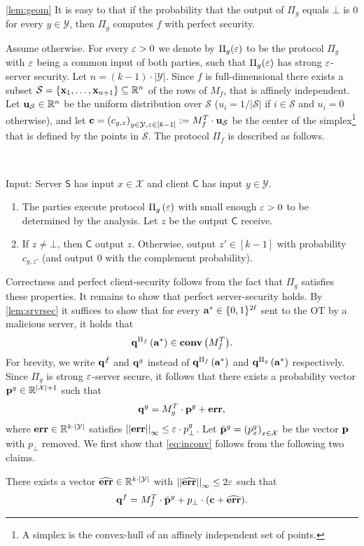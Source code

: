 \documentclass{llncs}
\renewcommand{\S}{\mathcal{S}}
\newcommand{\X}{\mathcal{X}}
\newcommand{\Y}{\mathcal{Y}}
\newcommand{\CH}[1]{\normalfont{\mathbf{conv}\of{#1}}}
\newcommand{\p}{\myvec{p}}
\renewcommand{\q}{\myvec{q}}
\renewcommand{\a}{\myvec{a}}
\renewcommand{\c}{\myvec{c}}
\newcommand{\x}{\myvec{x}}
\newcommand{\errvec}{\myvec{err}}
\newcommand{\norm}[2]{\left|\left|#1\right|\right|_{#2}}
\renewcommand{\Sc}{\mathsf{S}}
\newcommand{\Cc}{\mathsf{C}}
\begin{document}
\begin{proofof}{\cref{lem:geom}}
It is easy to that if the probability that the output of $\Pi_g$ equals $\bot$ is 0 for every $y\in\Y$, then $\Pi_g$ computes $f$ with perfect security.

Assume otherwise. For every $\varepsilon>0$ we denote by $\Pi_g(\varepsilon)$ to be the protocol $\Pi_g$ with $\varepsilon$ being a common input of both parties, such that $\Pi_g(\varepsilon)$ has strong $\varepsilon$-server security. Let $n=(k-1)\cdot|\Y|$. Since $f$ is full-dimensional there exists a subset $\S=\set{\x_1,\ldots,\x_{n+1}}\su\R^{n}$ of the rows of $M_f$, that is affinely independent. Let $\myvec{u}_\S\in\R^{n}$ be the uniform distribution over $\S$ (\ie $u_i=1/|\S|$ if $i\in\S$ and $u_i=0$ otherwise), and let $\c=\vect{c_{y,z}}_{y\in\Y,z\in[k-1]}:=M^T_f\cdot\myvec{u}_{\S}$ be the center of the simplex\footnote{A simplex is the convex-hull of an affinely independent set of points.} that is defined by the points in $\S$. The protocol $\Pi_f$ is described as follows. 

\begin{protocol}[$\Pi_f$]~

Input: Server $\Sc$ has input $x\in\X$ and client $\Cc$ has input $y\in\Y$.

\begin{enumerate}
	\item The parties execute protocol $\Pi_g\left ( \varepsilon \right )$ with small enough $\varepsilon>0$ to be determined by the analysis. Let $z$ be the output $\Cc$ receive.

	\item If $z\ne\bot$, then $\Cc$ output $z$. Otherwise, output $z'\in[k-1]$ with probability $c_{y,z'}$ (and output 0 with the complement probability).
\end{enumerate}
\end{protocol}

Correctness and perfect client-security follows from the fact that $\Pi_g$ satisfies these properties. It remains to show that perfect server-security holds. By \cref{lem:srvrsec} it suffices to show that for every $\a^*\in\zo^{2\ell}$ sent to the OT by a malicious server, it holds that
\begin{align}\label{eq:inconv}
\q^{\Pi_f}\of{\a^*}\in\CH{M_f^T}.
\end{align}
For brevity, we write $\q^f$ and $\q^g$ instead of $\q^{\Pi_f}\of{\a^*}$ and $\q^{\Pi_g}\of{\a^*}$ respectively. Since $\Pi_g$ is strong $\varepsilon$-server secure, it follows that there exists a probability vector $\p^g\in\R^{|\X|+1}$ such that
$$\q^{g}=M_g^T\cdot\p^g+\errvec,$$
where $\errvec\in\R^{k\cdot|\Y|}$ satisfies $\norm{\errvec}{\infty}\leq\eps\cdot p^g_\bot$. Let $\bar{\p}^g=\vect{p_x^g}_{x\in\X}$ be the vector $\p$ with $p_\bot$ removed. We first show that \cref{eq:inconv} follows from the following two claims.
\begin{claim}\label{clm:first}
There exists a vector $\widehat{\errvec}\in\R^{k\cdot|\Y|}$ with $\norm{\widehat{\errvec}}{\infty}\leq 2\eps$ such that 
$$\q^f=M_f^T\cdot\bar{\p}^g+p_\bot\cdot(\c+\widehat{\errvec}).$$
\end{claim}


\end{proofof}
\end{document}
